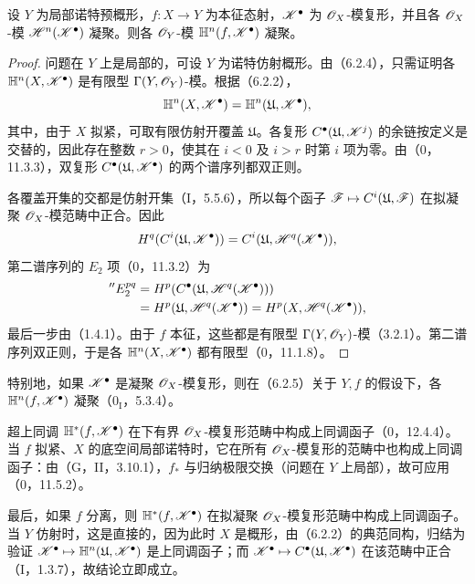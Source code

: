 设 $Y$ 为局部诺特预概形，$f:X\to Y$ 为本征态射，$\mathscr K^\bullet$ 为 $\mathscr O_X$-模复形，并且各 $\mathscr O_X$-模 $\mathscr H^n(\mathscr K^\bullet)$ 凝聚。则各 $\mathscr O_Y$-模 $\mathbb H^n(f,\mathscr K^\bullet)$ 凝聚。
\begin{proof}
问题在 $Y$ 上是局部的，可设 $Y$ 为诺特仿射概形。由（6.2.4），只需证明各 $\mathbb H^n(X,\mathscr K^\bullet)$ 是有限型 $\Gamma(Y,\mathscr O_Y)$-模。根据（6.2.2），
\[
 \mathbb H^n(X,\mathscr K^\bullet)=\mathbb H^n(\mathfrak U,\mathscr K^\bullet),
\]
其中，由于 $X$ 拟紧，可取有限仿射开覆盖 $\mathfrak U$。各复形 $C^\bullet(\mathfrak U,\mathscr K^j)$ 的余链按定义是交替的，因此存在整数 $r>0$，使其在 $i<0$ 及 $i>r$ 时第 $i$ 项为零。由（0，11.3.3），双复形 $C^\bullet(\mathfrak U,\mathscr K^\bullet)$ 的两个谱序列都双正则。

各覆盖开集的交都是仿射开集（I，5.5.6），所以每个函子 $\mathscr F\mapsto C^i(\mathfrak U,\mathscr F)$ 在拟凝聚 $\mathscr O_X$-模范畴中正合。因此
\[
 H^q(C^i(\mathfrak U,\mathscr K^\bullet))=C^i(\mathfrak U,\mathscr H^q(\mathscr K^\bullet)),
\]
第二谱序列的 $E_2$ 项（0，11.3.2）为
\begin{align*}
 {}''E_2^{pq}
 &=H^p(C^\bullet(\mathfrak U,\mathscr H^q(\mathscr K^\bullet)))\\
 &=H^p(\mathfrak U,\mathscr H^q(\mathscr K^\bullet))
 =H^p(X,\mathscr H^q(\mathscr K^\bullet)),
\end{align*}
最后一步由（1.4.1）。由于 $f$ 本征，这些都是有限型 $\Gamma(Y,\mathscr O_Y)$-模（3.2.1）。第二谱序列双正则，于是各 $\mathbb H^n(X,\mathscr K^\bullet)$ 都有限型（0，11.1.8）。
\end{proof}
特别地，如果 $\mathscr K^\bullet$ 是凝聚 $\mathscr O_X$-模复形，则在（6.2.5）关于 $Y,f$ 的假设下，各 $\mathbb H^n(f,\mathscr K^\bullet)$ 凝聚（$0_{\mathrm I}$，5.3.4）。

超上同调 $\mathbb H^*(f,\mathscr K^\bullet)$ 在下有界 $\mathscr O_X$-模复形范畴中构成上同调函子（0，12.4.4）。当 $f$ 拟紧、$X$ 的底空间局部诺特时，它在所有 $\mathscr O_X$-模复形的范畴中也构成上同调函子：由（G，II，3.10.1），$f_*$ 与归纳极限交换（问题在 $Y$ 上局部），故可应用（0，11.5.2）。

最后，如果 $f$ 分离，则 $\mathbb H^*(f,\mathscr K^\bullet)$ 在拟凝聚 $\mathscr O_X$-模复形范畴中构成上同调函子。当 $Y$ 仿射时，这是直接的，因为此时 $X$ 是概形，由（6.2.2）的典范同构，归结为验证 $\mathscr K^\bullet\mapsto\mathbb H^n(\mathfrak U,\mathscr K^\bullet)$ 是上同调函子；而 $\mathscr K^\bullet\mapsto C^\bullet(\mathfrak U,\mathscr K^\bullet)$ 在该范畴中正合（I，1.3.7），故结论立即成立。

